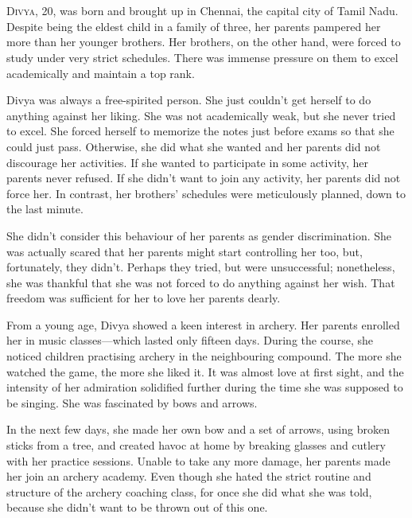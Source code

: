 \chapter{}

\lettrine{D}{ivya}, 20, was born and brought up in Chennai, the capital city of Tamil Nadu.
Despite being the eldest child in a family of three, her parents pampered her more than
her younger brothers. Her brothers, on the other hand, were forced to study under
very strict schedules. There was immense pressure on them to excel academically and maintain a top rank.

Divya was always a free-spirited person. She just couldn't get herself to do
anything against her liking. She was not academically weak, but she never tried to excel. She forced herself to memorize the notes just before exams so
that she could just pass. Otherwise, she did what she wanted and her parents did
not discourage her activities. If she wanted to participate in some activity,
her parents never refused. If she didn't want to join any activity, her parents
did not force her. In contrast, her brothers' schedules were meticulously planned,
down to the last minute.

She didn't consider this behaviour of her parents as gender discrimination. She
was actually scared that her parents might start controlling her too, but, fortunately,
they didn't. Perhaps they tried, but were unsuccessful; nonetheless, she was thankful
that she was not forced to do anything against her wish. That freedom was sufficient
for her to love her parents dearly.

From a young age, Divya showed a keen interest in archery. Her parents enrolled
her in music classes—which lasted only fifteen days. During the
course, she noticed children practising archery in the neighbouring compound.
The more she watched the game, the more she liked it. It was almost love at
first sight, and the intensity of her admiration solidified
further during the time she was supposed to be singing. She was fascinated by
bows and arrows.

In the next few days, she made her own bow and a set of arrows, using broken
sticks from a tree, and created havoc at home by breaking glasses and
cutlery with her practice sessions. Unable to take any more damage, her parents made her join an archery academy. Even though she hated the strict routine and structure of the archery coaching
class, for once she did what she was told, because she didn't want to be thrown out of
this one.

